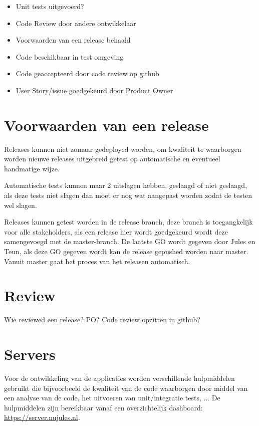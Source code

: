 	\begin{itemize}
			\item Unit tests uitgevoerd?
			\item Code Review door andere ontwikkelaar
			\item Voorwaarden van een release behaald
			\item Code beschikbaar in test omgeving
			\item Code geaccepteerd door code review op github
			\item User Story/issue goedgekeurd door Product Owner		
	\end{itemize}

\section{Voorwaarden van een release}
Releases kunnen niet zomaar gedeployed worden, om kwaliteit te waarborgen worden nieuwe releases uitgebreid getest op automatische en eventueel handmatige wijze.

Automatische tests kunnen maar 2 uitslagen hebben, geslaagd of niet geslaagd, als deze tests niet slagen dan moet er nog wat aangepast worden zodat de testen wel slagen.

Releases kunnen getest worden in de release branch, deze branch is toegangkelijk voor alle stakeholders, als een release hier wordt goedgekeurd wordt deze samengevoegd met de master-branch.
De laatste GO wordt gegeven door Jules en Teun, als deze GO gegeven wordt kan de release gepushed worden naar master.
Vanuit master gaat het proces van het releasen automatisch.

\section{Review}
Wie reviewed een release? PO? Code review opzitten in github?

\section{Servers}
Voor de ontwikkeling van de applicaties worden verschillende hulpmiddelen gebruikt die bijvoorbeeld de kwaliteit van de code waarborgen door middel van een analyse van de code, het uitvoeren van unit/integratie tests, ...
De hulpmiddelen zijn bereikbaar vanaf een overzichtelijk dashboard: \href{https://server.nujules.nl}{https://server.nujules.nl}.


